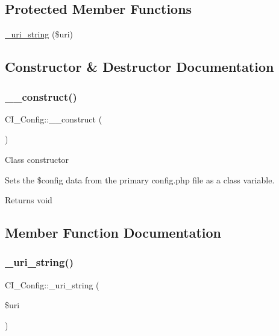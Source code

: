 \subsection*{Protected Member Functions}
\begin{DoxyCompactItemize}
\item 
\mbox{\hyperlink{class_c_i___config_a5f8634d3b82b9af52422821a7df568a3}{\+\_\+uri\+\_\+string}} (\$uri)
\end{DoxyCompactItemize}


\subsection{Constructor \& Destructor Documentation}
\mbox{\label{class_c_i___config_abf45f6b82f733395efce1fce008d7a6b}} 
\subsubsection{\texorpdfstring{\+\_\+\+\_\+construct()}{\_\_construct()}}
{\footnotesize\ttfamily C\+I\+\_\+\+Config\+::\+\_\+\+\_\+construct (\begin{DoxyParamCaption}{ }\end{DoxyParamCaption})}

Class constructor

Sets the \$config data from the primary config.\+php file as a class variable.

\begin{DoxyReturn}{Returns}
void 
\end{DoxyReturn}


\subsection{Member Function Documentation}
\mbox{\label{class_c_i___config_a5f8634d3b82b9af52422821a7df568a3}} 
\subsubsection{\texorpdfstring{\+\_\+uri\+\_\+string()}{\_uri\_string()}}
{\footnotesize\ttfamily C\+I\+\_\+\+Config\+::\+\_\+uri\+\_\+string (\begin{DoxyParamCaption}\item[{}]{\$uri }\end{DoxyParamCaption})\hspace{0.3cm}{\ttfamily [protected]}}

